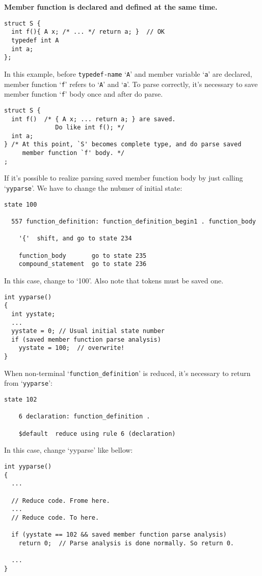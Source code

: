 \documentclass{article}
\begin{document}
\large
{\bf{Member function is declared and defined at the same time.}}
\normalsize

\begin{verbatim}
struct S {
  int f(){ A x; /* ... */ return a; }  // OK
  typedef int A
  int a;
};
\end{verbatim}
In this example,
before {\tt{typedef-name}} `{\tt{A}}' and member variable `{\tt{a}}'
are declared, member function `{\tt{f}}' refers to `{\tt{A}}' and
`{\tt{a}}'. To parse correctly, it's necessary to save member
function `{\tt{f}}' body once and after do parse.

\begin{verbatim}
struct S {
  int f()  /* { A x; ... return a; } are saved.
              Do like int f(); */
  int a;
} /* At this point, `S' becomes complete type, and do parse saved
     member function `f' body. */
;
\end{verbatim}
If it's possible to realize parsing saved member function body
by just calling `{\tt{yyparse}}'. We have to change the nubmer
of initial state:
\begin{verbatim}
state 100

  557 function_definition: function_definition_begin1 . function_body

    '{'  shift, and go to state 234

    function_body       go to state 235
    compound_statement  go to state 236
\end{verbatim}
In this case, change to `100'. Also note that tokens must be
saved one.
\begin{verbatim}
int yyparse()
{
  int yystate;
  ...
  yystate = 0; // Usual initial state number
  if (saved member function parse analysis)
    yystate = 100;  // overwrite!
}
\end{verbatim}
When non-terminal `{\tt{function\_definition}}' is reduced,
it's necessary to return from `{\tt{yyparse}}':
\begin{verbatim}
state 102

    6 declaration: function_definition .

    $default  reduce using rule 6 (declaration)
\end{verbatim}
In this case, change `yyparse' like bellow:
\begin{verbatim}
int yyparse()
{
  ...

  // Reduce code. Frome here.
  ...
  // Reduce code. To here.

  if (yystate == 102 && saved member function parse analysis)
    return 0;  // Parse analysis is done normally. So return 0.

  ...
} 
\end{verbatim}
\end{document}
